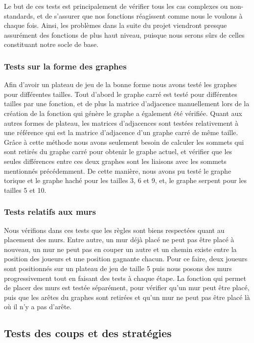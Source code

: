 \documentclass[a4paper]{article}
\begin{document}
Le but de ces tests est principalement de vérifier tous les cas complexes ou non-standards, et de s'assurer que nos fonctions réagissent comme nous le voulons à chaque fois. Ainsi, les problèmes dans la suite du projet viendront presque assurément des fonctions de plus haut niveau, puisque nous serons sûrs de celles constituant notre socle de base. 

\subsubsection{Tests sur la forme des graphes}
Afin d'avoir un plateau de jeu de la bonne forme nous avons testé les graphes pour différentes tailles.
Tout d'abord le graphe carré est testé pour différentes tailles par une fonction, et de plus la matrice d'adjacence manuellement lors de la création de la fonction qui génère le graphe a également été vérifiée. Quant aux autres formes de plateau, les matrices d'adjacences sont testées relativement à une référence qui est la matrice d'adjacence d'un graphe carré de même taille. Grâce à cette méthode nous avons seulement besoin de calculer les sommets qui sont retirés du graphe carré pour obtenir le graphe actuel, et vérifier que les seules différences entre ces deux graphes sont les liaisons avec les sommets mentionnés précédemment. De cette manière, nous avons pu testé le graphe torique et le graphe haché pour les tailles 3, 6 et 9, et, le graphe serpent pour les tailles 5 et 10.

\subsubsection{Tests relatifs aux murs}
Nous vérifions dans ces tests que les règles sont biens respectées quant au placement des murs.
Entre autre, un mur déjà placé ne peut pas être placé à nouveau, un mur ne peut pas en couper un autre et un chemin existe entre la position des joueurs et une position gagnante chacun. Pour ce faire, deux joueurs sont positionnés sur un plateau de jeu de taille 5 puis nous posons des murs progressivement tout en faisant des tests à chaque étape. La fonction qui permet de placer des murs est testée séparément, pour vérifier qu'un mur peut être placé, puis que les arêtes du graphes sont retirées et qu'un mur ne peut pas être placé là où il n'y a pas d'arête.

\subsection{Tests des coups et des stratégies}
\end{document}
